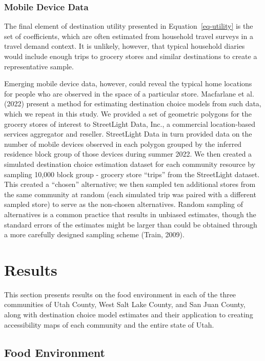 \documentclass[
  letterpaper,
  number,
  review,
  3p]{elsarticle}
\begin{document}
\subsubsection{Mobile Device Data}\label{mobile-device-data}

The final element of destination utility presented in
Equation~\ref{eq-utility} is the set of coefficients, which are often
estimated from household travel surveys in a travel demand context. It
is unlikely, however, that typical household diaries would include
enough trips to grocery stores and similar destinations to create a
representative sample.

Emerging mobile device data, however, could reveal the typical home
locations for people who are observed in the space of a particular
store. Macfarlane et al. (2022) present a method for estimating
destination choice models from such data, which we repeat in this study.
We provided a set of geometric polygons for the grocery stores of
interest to StreetLight Data, Inc., a commercial location-based services
aggregator and reseller. StreetLight Data in turn provided data on the
number of mobile devices observed in each polygon grouped by the
inferred residence block group of those devices during summer 2022. We
then created a simulated destination choice estimation dataset for each
community resource by sampling 10,000 block group - grocery store
``trips'' from the StreetLight dataset. This created a ``chosen''
alternative; we then sampled ten additional stores from the same
community at random (each simulated trip was paired with a different
sampled store) to serve as the non-chosen alternatives. Random sampling
of alternatives is a common practice that results in unbiased estimates,
though the standard errors of the estimates might be larger than could
be obtained through a more carefully designed sampling scheme (Train,
2009).


\section{Results}\label{sec-results}

This section presents results on the food environment in each of the
three communities of Utah County, West Salt Lake County, and San Juan
County, along with destination choice model estimates and their
application to creating accessibility maps of each community and the
entire state of Utah.

\subsection{Food Environment}\label{sec-nems}
\end{document}
